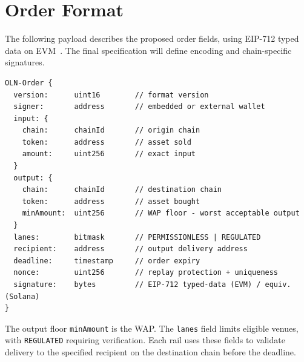 \noindent\begin{minipage}{\textwidth}
\section{Order Format}\label{app:order}

The following payload describes the proposed order fields, using EIP-712 typed data on EVM~\cite{eip712}. The final specification will define encoding and chain-specific signatures.

{\footnotesize
\begin{verbatim}
OLN-Order {
  version:      uint16        // format version
  signer:       address       // embedded or external wallet
  input: {
    chain:      chainId       // origin chain
    token:      address       // asset sold
    amount:     uint256       // exact input
  }
  output: {
    chain:      chainId       // destination chain
    token:      address       // asset bought
    minAmount:  uint256       // WAP floor - worst acceptable output
  }
  lanes:        bitmask       // PERMISSIONLESS | REGULATED
  recipient:    address       // output delivery address
  deadline:     timestamp     // order expiry
  nonce:        uint256       // replay protection + uniqueness
  signature:    bytes         // EIP-712 typed-data (EVM) / equiv. (Solana)
}
\end{verbatim}
}

The output floor \texttt{minAmount} is the WAP. The \texttt{lanes} field limits eligible venues, with \texttt{REGULATED} requiring verification. Each rail uses these fields to validate delivery to the specified recipient on the destination chain before the deadline.
\end{minipage}\par
